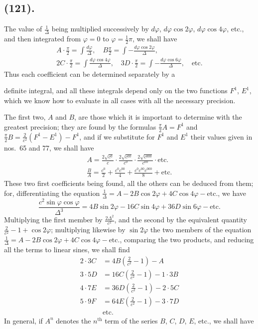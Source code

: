 \documentclass{article}
\begin{document}
\subsection*{(121).}

The value of $\frac{1}{\Delta}$ being multiplied successively by $d\varphi$, $d\varphi\cos2\varphi$, $d\varphi\cos4\varphi$, etc., and then integrated from $\varphi=0$ to $\varphi=\frac{1}{2}\pi$, we shall have
\[ \begin{gathered} A\cdot\frac{\pi}{2}=\int\frac{d\varphi}{\Delta},\quad B\frac{\pi}{2}=\int-\frac{d\varphi\cos2\varphi}{\Delta},\\ 2C\cdot\frac{\pi}{2}=\int\frac{d\varphi\cos4\varphi}{\Delta},\quad 3D\cdot\frac{\pi}{2}=\int-\frac{d\varphi\cos6\varphi}{\Delta},\quad\text{etc.} \end{gathered} \]
Thus each coefficient can be determined separately by a

definite integral, and all these integrals depend only on the two functions $F^{1}$, $E^{1}$, which we know how to evaluate in all cases with all the necessary precision.

The first two, $A$ and $B$, are those which it is important to determine with the greatest precision; they are found by the formulas $\frac{\pi}{2}A=F^{1}$ and $\frac{\pi}{2}B=\frac{2}{c^{2}}(F^{1}-E^{1})-F^{1}$, and if we substitute for $F^{1}$ and $E^{1}$ their values given in nos.\ 65 and 77, we shall have
\[ \begin{gathered} A=\frac{2\sqrt{c^{0}}}{c}\cdot\frac{2\sqrt{c^{00}}}{c^{0}}\cdot\frac{2\sqrt{c^{000}}}{c^{00}}\cdot\text{etc.}\\ \frac{B}{A}=\frac{c^{0}}{2}+\frac{c^{0}c^{00}}{4}+\frac{c^{0}c^{00}c^{000}}{8}+\text{etc.} \end{gathered} \]
These two first coefficients being found, all the others can be deduced from them; for, differentiating the equation $\frac{1}{\Delta}=A-2B\cos2\varphi+4C\cos4\varphi-\text{etc.}$, we have
\[ \frac{c^{2}\sin\varphi\cos\varphi}{\Delta^{3}}=4B\sin2\varphi-16C\sin4\varphi+36D\sin6\varphi-\text{etc.} \]
Multiplying the first member by $\frac{2\Delta^{2}}{c^{2}}$, and the second by the equivalent quantity $\frac{2}{c^{2}}-1+\cos2\varphi$; multiplying likewise by $\sin2\varphi$ the two members of the equation $\frac{1}{\Delta}=A-2B\cos2\varphi+4C\cos4\varphi-\text{etc.}$, comparing the two products, and reducing all the terms to linear sines, we shall find
\[ \begin{aligned} 2\cdot3C&=4B\left(\frac{2}{c^{2}}-1\right)-A\\ 3\cdot5D&=16C\left(\frac{2}{c^{2}}-1\right)-1\cdot3B\\ 4\cdot7E&=36D\left(\frac{2}{c^{2}}-1\right)-2\cdot5C\\ 5\cdot9F&=64E\left(\frac{2}{c^{2}}-1\right)-3\cdot7D\\ &\text{etc.} \end{aligned} \]
In general, if $A^{n}$ denotes the $n^{\text{th}}$ term of the series $B$, $C$, $D$, $E$, etc., we shall have
\end{document}
